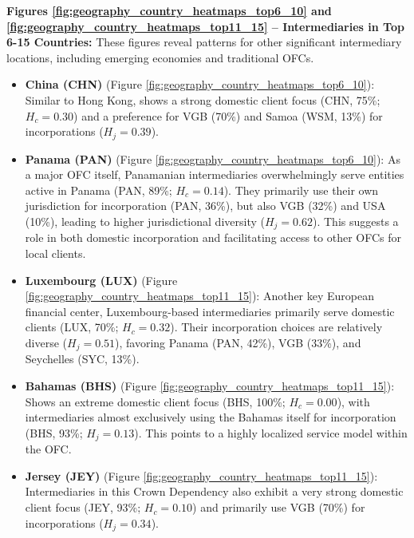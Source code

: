 \textbf{Figures \ref{fig:geography_country_heatmaps_top6_10} and \ref{fig:geography_country_heatmaps_top11_15} – Intermediaries in Top 6-15 Countries:}
These figures reveal patterns for other significant intermediary locations, including emerging economies and traditional OFCs.

\begin{itemize}
    \item \textbf{China (CHN)} (Figure \ref{fig:geography_country_heatmaps_top6_10}): Similar to Hong Kong, shows a strong domestic client focus (CHN, 75\%; $H_c=0.30$) and a preference for VGB (70\%) and Samoa (WSM, 13\%) for incorporations ($H_j=0.39$).

    \item \textbf{Panama (PAN)} (Figure \ref{fig:geography_country_heatmaps_top6_10}): As a major OFC itself, Panamanian intermediaries overwhelmingly serve entities active in Panama (PAN, 89\%; $H_c=0.14$). They primarily use their own jurisdiction for incorporation (PAN, 36\%), but also VGB (32\%) and USA (10\%), leading to higher jurisdictional diversity ($H_j=0.62$). This suggests a role in both domestic incorporation and facilitating access to other OFCs for local clients.

    \item \textbf{Luxembourg (LUX)} (Figure \ref{fig:geography_country_heatmaps_top11_15}): Another key European financial center, Luxembourg-based intermediaries primarily serve domestic clients (LUX, 70\%; $H_c=0.32$). Their incorporation choices are relatively diverse ($H_j=0.51$), favoring Panama (PAN, 42\%), VGB (33\%), and Seychelles (SYC, 13\%).

    \item \textbf{Bahamas (BHS)} (Figure \ref{fig:geography_country_heatmaps_top11_15}): Shows an extreme domestic client focus (BHS, 100\%; $H_c=0.00$), with intermediaries almost exclusively using the Bahamas itself for incorporation (BHS, 93\%; $H_j=0.13$). This points to a highly localized service model within the OFC.

    \item \textbf{Jersey (JEY)} (Figure \ref{fig:geography_country_heatmaps_top11_15}): Intermediaries in this Crown Dependency also exhibit a very strong domestic client focus (JEY, 93\%; $H_c=0.10$) and primarily use VGB (70\%) for incorporations ($H_j=0.34$).
\end{itemize}

